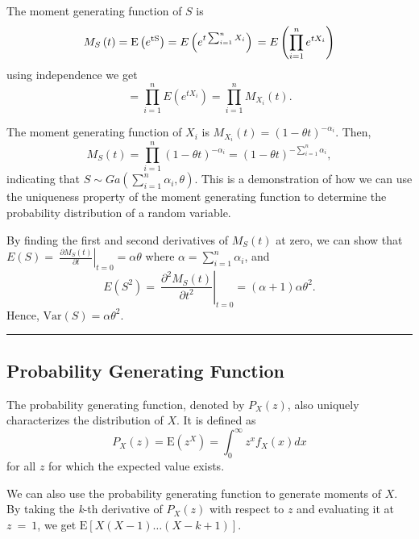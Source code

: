 \documentclass[]{book}
\theoremstyle{definition}
\theoremstyle{definition}
\theoremstyle{definition}
\theoremstyle{remark}
\begin{document}
The moment generating function of \(S\) is
\[M_{S}\left( t \right) = \text{E}\left( e^{\text{tS}} \right) = E\left( e^{t\sum_{i = 1}^{n}X_{i}} \right) \\
= E\left( \prod_{i = 1}^{n}e^{tX_{i}} \right)\] using independence we
get\\
\[= \prod_{i = 1}^{n}{E\left( e^{tX_{i}} \right) = \prod_{i = 1}^{n}{M_{X_{i}}\left( t \right)}} .\]

The moment generating function of \(X_{i}\) is
\(M_{X_{i}}\left( t \right) = \left( 1 - \theta t \right)^{- \alpha_{i}}\).
Then,
\[M_{S}\left( t \right) = \prod_{i = 1}^{n}\left( 1 - \theta t \right)^{- \alpha_{i}} = \left( 1 - \theta t \right)^{- \sum_{i = 1}^{n}\alpha_{i}}, \]
indicating that
\(S\sim Ga\left( \sum_{i = 1}^{n}\alpha_{i},\theta \right)\). This is a
demonstration of how we can use the uniqueness property of the moment
generating function to determine the probability distribution of a
random variable.

By finding the first and second derivatives of \(M_{S}\left( t \right)\)
at zero, we can show that
\(E\left( S \right) = \left. \ \frac{\partial M_{S}\left( t \right)}{\partial t} \right|_{t = 0} = \alpha\theta\)
where \(\alpha = \sum_{i = 1}^{n}\alpha_{i}\), and
\[E\left( S^{2} \right) = \left. \ \frac{\partial^{2}M_{S}\left( t \right)}{\partial t^{2}} \right|_{t = 0} = \left( \alpha + 1 \right)\alpha\theta^{2}.\]
Hence, \(\mathrm{Var}\left( S \right) = \alpha\theta^{2}\).

\begin{center}\rule{0.5\linewidth}{\linethickness}\end{center}

\subsection{Probability Generating
Function}\label{probability-generating-function}

The probability generating function, denoted by
\(P_{X}\left( z \right)\), also uniquely characterizes the distribution
of \(X\). It is defined as
\[P_{X}\left( z \right) = \mathrm{E}\left( z^{X} \right) = \int_{0}^{\infty}{z^{x}f_{X}\left( x \right) dx}\]
for all \(z\) for which the expected value exists.

We can also use the probability generating function to generate moments
of \(X\). By taking the \emph{k}-th derivative of
\(P_{X}\left( z \right)\) with respect to \(z\) and evaluating it at
\(z\  = \ 1\), we get
\(\mathrm{E}\left\lbrack X\left( X - 1 \right)\ldots\left( X - k + 1 \right) \right\rbrack .\)
\end{document}
